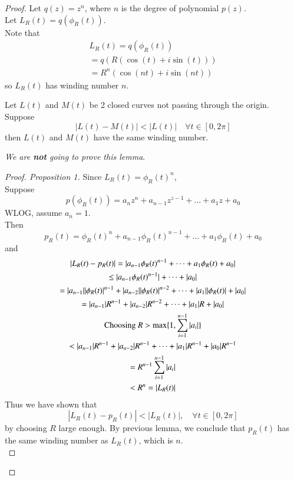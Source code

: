 \documentclass[11pt]{article}
\begin{document}
		\begin{proof}
			Let $q(z) = z^n$, where $n$ is the degree of polynomial $p(z)$. \\
			Let $L_R(t) = q(\phi_R(t))$. \\
			Note that
			\begin{gather*}
				L_R(t) = q(\phi_R(t)) \\
				= q(R(\cos(t) + i\sin(t))) \\
				= R^n (\cos(nt) + i\sin(nt))
			\end{gather*}
			so $L_R(t)$ has winding number $n$. \\
			\begin{lemma}
				Let $L(t)$ and $M(t)$ be 2 closed curves not passing through the origin. \\
				Suppose 
				\[
					| L(t) - M(t) | < | L(t) |\quad \forall t \in [0, 2\pi]
				\]
				then $L(t)$ and $M(t)$ have the same winding number.
			\end{lemma}
			\emph{We are \textbf{not} going to prove this lemma}. \\
			\begin{proof}[Proof. Proposition 1]
				Since $L_R(t) = \phi_R(t)^n$, \\
				Suppose 
				\[
					p(\phi_R(t)) = a_n z^n + a_{n-1} z^{z-1} + \dots + a_1 z + a_0
				\]
				WLOG, assume $a_n=1$. \\
				Then 
				\[
					p_R(t) = \phi_R(t)^n + a_{n-1} \phi_R(t)^{n-1} + \dots + a_1 \phi_R(t) + a_0
				\]
				and 
				\begin{gather*}
					|L_R(t) - p_R(t)| = |a_{n-1} \phi_R(t)^{n-1} + \dots + a_1 \phi_R(t) + a_0| \\
					\leq |a_{n-1}\phi_R(t)^{n-1}| + \dots + |a_0| \\
					= |a_{n-1}| |\phi_R(t)|^{n-1} + |a_{n-2}| |\phi_R(t)|^{n-2} + \dots + |a_1| |\phi_R(t)| + |a_0| \\
					= |a_{n-1}| R^{n-1} + |a_{n-2}| R^{n-2} + \dots + |a_1| R + |a_0| \\
					\text{{Choosing }} R > \max \{1, \sum_{i=1}^{n-1}|a_i|\} \\
					< |a_{n-1}| R^{n-1} + |a_{n-2}| R^{n-1} + \dots + |a_1| R^{n-1} + |a_0| R^{n-1} \\
					= R^{n-1} \sum_{i=1}^{n-1} |a_i| \\
					< R^n = |L_R(t)|
				\end{gather*}
				Thus we have shown that
				\[
					|L_R(t) - p_R(t)| < |L_R(t)|,\quad \forall t \in [0, 2\pi]
				\]
				by choosing $R$ large enough. By previous lemma, we conclude that $p_R(t)$ has the same winding number as $L_R(t)$, which is $n$. \\

\end{proof}
\end{proof}
\end{document}
